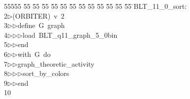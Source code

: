 %
%
\begin{tabbing}
55555 \= 55 \= 55 \= 55 \= 55 \= 55 \= 55 \= 55 \= 55 \= 55 \= 55 \= 55 \= 55 \= \>BLT\_11\_0\_sort:\\[0pt]
2\>$\triangleright$\>(ORBITER)\ v\ 2\ \\[0pt]
3\>$\triangleright$\>$\triangleright$\>define\ G\ graph\ \\[0pt]
4\>$\triangleright$\>$\triangleright$\>$\triangleright$\>load\ BLT\_q11\_graph\_5\_0bin\ \\[0pt]
5\>$\triangleright$\>$\triangleright$\>end\ \\[0pt]
6\>$\triangleright$\>$\triangleright$\>with\ G\ do\ \\[0pt]
7\>$\triangleright$\>$\triangleright$\>graph\_theoretic\_activity\ \\[0pt]
8\>$\triangleright$\>$\triangleright$\>$\triangleright$\>sort\_by\_colors\ \\[0pt]
9\>$\triangleright$\>$\triangleright$\>end\\[0pt]
10\>\end{tabbing}

